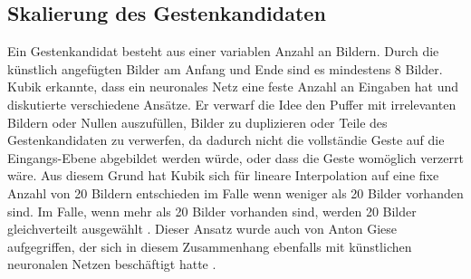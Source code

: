 \subsection{Skalierung des Gestenkandidaten}
\label{sec:scaling}
Ein Gestenkandidat besteht aus einer variablen Anzahl an Bildern. Durch die künstlich angefügten Bilder am Anfang und Ende sind es mindestens 8 Bilder. Kubik erkannte, dass ein neuronales Netz eine feste Anzahl an
Eingaben hat und diskutierte verschiedene Ansätze. Er verwarf die Idee den Puffer mit irrelevanten Bildern oder Nullen auszufüllen, Bilder zu duplizieren oder Teile des Gestenkandidaten zu verwerfen, da dadurch
nicht die vollständie Geste auf die Eingangs-Ebene abgebildet werden würde, oder dass die Geste womöglich verzerrt wäre. Aus diesem Grund hat Kubik sich für lineare Interpolation auf eine fixe Anzahl von 20 Bildern
entschieden im Falle wenn weniger als 20 Bilder vorhanden sind. Im Falle, wenn mehr als 20 Bilder vorhanden sind, werden 20 Bilder gleichverteilt ausgewählt \cite{kubikThesis}.
Dieser Ansatz wurde auch von Anton Giese aufgegriffen, der sich in diesem Zusammenhang ebenfalls mit künstlichen neuronalen Netzen beschäftigt hatte \cite{gieseThesis}.
